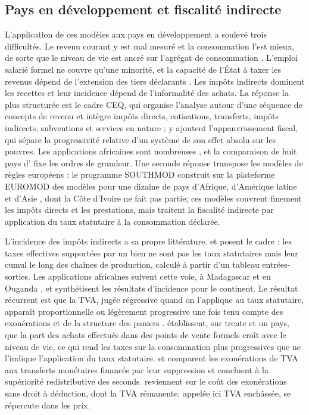 \documentclass[11pt,a4paper]{article}
\begin{document}
\subsection{Pays en développement et fiscalité indirecte}

L'application de ces modèles aux pays en développement a soulevé trois
difficultés. Le revenu courant y est mal mesuré et la consommation l'est mieux,
de sorte que le niveau de vie est ancré sur l'agrégat de consommation
\citep{deaton1997,deatonzaidi2002}. L'emploi salarié formel ne couvre qu'une
minorité, et la capacité de l'État à taxer les revenus dépend de l'extension
des tiers déclarants \citep{jensen2022}. Les impôts indirects dominent les
recettes et leur incidence dépend de l'informalité des achats. La réponse la
plus structurée est le cadre CEQ, qui organise l'analyse autour d'une séquence
de concepts de revenu et intègre impôts directs, cotisations, transferts, impôts
indirects, subventions et services en nature \citep{lustig2017,lustig2022};
\citet{higgins2016} y ajoutent l'appauvrissement fiscal, qui sépare la
progressivité relative d'un système de son effet absolu sur les pauvres. Les
applications africaines sont nombreuses \citep{younger2015,hill2017,akim2020},
et la comparaison de huit pays d'\citet{inchaustelustig2017} fixe les ordres de
grandeur. Une seconde réponse transpose les modèles de règles européens : le
programme SOUTHMOD construit sur la plateforme EUROMOD des modèles pour une
dizaine de pays d'Afrique, d'Amérique latine et d'Asie
\citep{decoster2019,gasior2018}, dont la Côte d'Ivoire ne fait pas partie; ces
modèles couvrent finement les impôts directs et les prestations, mais traitent
la fiscalité indirecte par application du taux statutaire à la consommation
déclarée.

L'incidence des impôts indirects a sa propre littérature. \citet{ahmadstern1984}
et \citet{ahmadstern1991} posent le cadre : les taxes effectives supportées par
un bien ne sont pas les taux statutaires mais leur cumul le long des chaînes de
production, calculé à partir d'un tableau entrées-sorties. Les applications
africaines suivent cette voie, à Madagascar \citep{rajemisonyounger2000} et en
Ouganda \citep{chen2001}, et \citet{sahnyounger2000} synthétisent les résultats
d'incidence pour le continent. Le résultat récurrent est que la TVA, jugée
régressive quand on l'applique au taux statutaire, apparaît proportionnelle ou
légèrement progressive une fois tenu compte des exonérations et de la structure
des paniers \citep{jenkins2006}. \citet{bachas2024} établissent, sur trente et
un pays, que la part des achats effectués dans des points de vente formels
croît avec le niveau de vie, ce qui rend les taxes sur la consommation plus
progressives que ne l'indique l'application du taux statutaire.
\citet{warwick2022} et \citet{harris2018} comparent les exonérations de TVA aux
transferts monétaires financés par leur suppression et concluent à la
supériorité redistributive des seconds. \citet{chandler2025} reviennent sur le
coût des exonérations sans droit à déduction, dont la TVA rémanente, appelée
ici TVA enchâssée, se répercute dans les prix.
\end{document}
